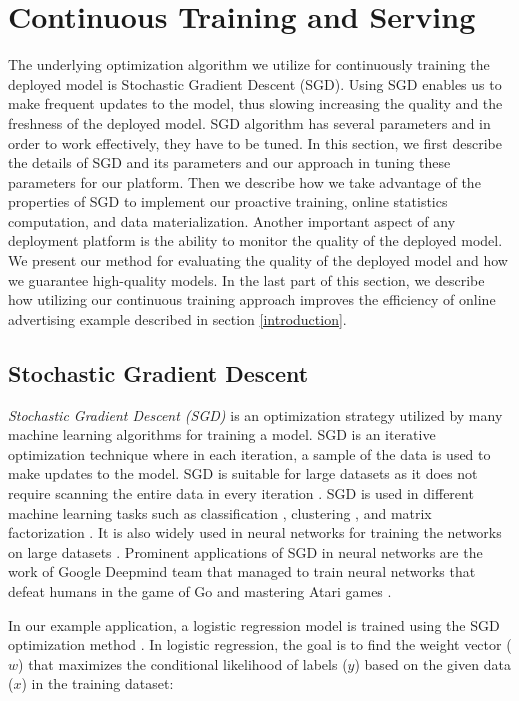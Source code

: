 \section{Continuous Training and Serving} \label{continuous-training-serving}
The underlying optimization algorithm we utilize for continuously training the deployed model is Stochastic Gradient Descent (SGD).
Using SGD enables us to make frequent updates to the model, thus slowing increasing the quality and the freshness of the deployed model.
SGD algorithm has several parameters and in order to work effectively, they have to be tuned.
In this section, we first describe the details of SGD and its parameters and our approach in tuning these parameters for our platform.
Then we describe how we take advantage of the properties of SGD to implement our proactive training, online statistics computation, and data materialization.
Another important aspect of any deployment platform is the ability to monitor the quality of the deployed model.
We present our method for evaluating the quality of the deployed model and how we guarantee high-quality models.
In the last part of this section, we describe how utilizing our continuous training approach improves the efficiency of online advertising example described in section \ref{introduction}.

\subsection{Stochastic Gradient Descent} \label{sgd}
\textit{Stochastic Gradient Descent (SGD)} is an optimization strategy utilized by many machine learning algorithms for training a model.
SGD is an iterative optimization technique where in each iteration, a sample of the data is used to make updates to the model.
SGD is suitable for large datasets as it does not require scanning the entire data in every iteration \cite{bottou2010large}.
SGD is used in different machine learning tasks such as classification \cite{zhang2004solving, macmahan2013}, clustering \cite{bottou1995convergence}, and matrix factorization \cite{koren2009matrix,  funk2006netflix}.
It is also widely used in neural networks for training the networks on large datasets \cite{dean2012large}.
Prominent applications of SGD in neural networks are the work of Google Deepmind team that managed to train neural networks that defeat humans in the game of Go \cite{silver2016mastering} and mastering Atari games \cite{mnih2013playing}.

In our example application, a logistic regression model is trained using the SGD optimization method \cite{macmahan2013}.
In logistic regression, the goal is to find the weight vector ($w$) that maximizes the conditional likelihood of labels ($y$) based on the given data ($x$) in the training dataset:

